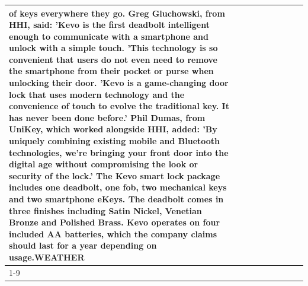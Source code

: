 \begin{table}[H]
\begin{tabular}{lllrlllll}
of keys everywhere they go. Greg Gluchowski, from HHI, said: 'Kevo is the first deadbolt intelligent enough to communicate with a smartphone and unlock with a simple touch. 'This technology is so convenient that users do not even need to remove the smartphone from their pocket or purse when unlocking their door. 'Kevo is a game-changing door lock that uses modern technology and the convenience of touch to evolve the traditional key. It has never been done before.' Phil Dumas, from UniKey, which worked alongside HHI, added: 'By uniquely combining existing mobile and Bluetooth technologies, we’re bringing your front door into the digital age without compromising the look or security of the lock.' The Kevo smart lock package includes one deadbolt, one fob, two mechanical keys and two smartphone eKeys. The deadbolt comes in three finishes including Satin Nickel, Venetian Bronze and Polished Brass. Kevo operates on four included AA batteries, which the company claims should last for a year depending on usage.WEATHER \\
\cline{1-9}

\end{tabular}
\end{table}
